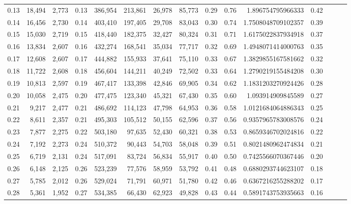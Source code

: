 \begin{tabular}{rrrrrrrrrrrrrrr}
0.13 &  18,494 &  2,773 &  0.13 &  386,954 &  213,861 &   26,978 &   85,773 &  0.29 &  0.76 &       1.896754795966333 &      0.42 \\
0.14 &  16,456 &  2,730 &  0.14 &  403,410 &  197,405 &   29,708 &   83,043 &  0.30 &  0.74 &      1.7508048709102357 &      0.39 \\
0.15 &  15,030 &  2,719 &  0.15 &  418,440 &  182,375 &   32,427 &   80,324 &  0.31 &  0.71 &      1.6175022837934918 &      0.37 \\
0.16 &  13,834 &  2,607 &  0.16 &  432,274 &  168,541 &   35,034 &   77,717 &  0.32 &  0.69 &      1.4948071414000763 &      0.35 \\
0.17 &  12,608 &  2,607 &  0.17 &  444,882 &  155,933 &   37,641 &   75,110 &  0.33 &  0.67 &      1.3829855167581662 &      0.32 \\
0.18 &  11,722 &  2,608 &  0.18 &  456,604 &  144,211 &   40,249 &   72,502 &  0.33 &  0.64 &      1.2790219155484208 &      0.30 \\
0.19 &  10,813 &  2,597 &  0.19 &  467,417 &  133,398 &   42,846 &   69,905 &  0.34 &  0.62 &      1.1831203270924426 &      0.28 \\
0.20 &  10,058 &  2,475 &  0.20 &  477,475 &  123,340 &   45,321 &   67,430 &  0.35 &  0.60 &       1.093914909845589 &      0.27 \\
0.21 &   9,217 &  2,477 &  0.21 &  486,692 &  114,123 &   47,798 &   64,953 &  0.36 &  0.58 &      1.0121684064886343 &      0.25 \\
0.22 &   8,611 &  2,357 &  0.21 &  495,303 &  105,512 &   50,155 &   62,596 &  0.37 &  0.56 &      0.9357965783008576 &      0.24 \\
0.23 &   7,877 &  2,275 &  0.22 &  503,180 &   97,635 &   52,430 &   60,321 &  0.38 &  0.53 &      0.8659346702024816 &      0.22 \\
0.24 &   7,192 &  2,273 &  0.24 &  510,372 &   90,443 &   54,703 &   58,048 &  0.39 &  0.51 &      0.8021480962474834 &      0.21 \\
0.25 &   6,719 &  2,131 &  0.24 &  517,091 &   83,724 &   56,834 &   55,917 &  0.40 &  0.50 &      0.7425566070367446 &      0.20 \\
0.26 &   6,148 &  2,125 &  0.26 &  523,239 &   77,576 &   58,959 &   53,792 &  0.41 &  0.48 &      0.6880293744623107 &      0.18 \\
0.27 &   5,785 &  2,012 &  0.26 &  529,024 &   71,791 &   60,971 &   51,780 &  0.42 &  0.46 &      0.6367216255288202 &      0.17 \\
0.28 &   5,361 &  1,952 &  0.27 &  534,385 &   66,430 &   62,923 &   49,828 &  0.43 &  0.44 &      0.5891743753935663 &      0.16 \\

\end{tabular}
